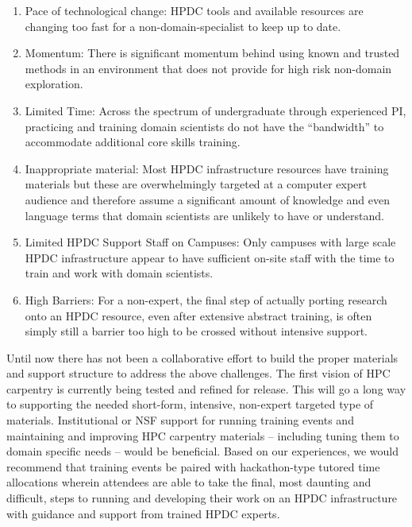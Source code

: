 \documentclass[10pt,letterpaper,draft]{article}
\begin{document}
\begin{enumerate}
    \item Pace of technological change: HPDC tools and available resources are changing too fast for a non-domain-specialist to keep up to date.
    \item Momentum:  There is significant momentum behind using known and trusted methods in an environment that does not provide for high risk non-domain exploration.
    \item Limited Time:  Across the spectrum of undergraduate through experienced PI, practicing and training domain scientists do not have the ``bandwidth'' to accommodate additional core skills training.
    \item Inappropriate material: Most HPDC infrastructure resources have training materials but these are overwhelmingly targeted at a computer expert audience and therefore assume a significant amount of knowledge and even language terms that domain scientists are unlikely to have or understand.
    \item Limited HPDC Support Staff on Campuses: Only campuses with large scale HPDC infrastructure appear to have sufficient on-site staff with the time to train and work with domain scientists. 
    \item High Barriers: For a non-expert, the final step of actually porting research onto an HPDC resource, even after extensive abstract training, is often simply still a barrier too high to be crossed without intensive support.

\end{enumerate}
Until now there has not been a collaborative effort to build the proper materials and support structure to address the above challenges. The first vision of HPC carpentry is currently being tested and refined for release. This will go a long way to supporting the needed short-form, intensive, non-expert targeted type of materials. Institutional or NSF support for running training events and maintaining and improving HPC carpentry materials -- including tuning them to domain specific needs -- would be beneficial. Based on our experiences, we would recommend that training events be paired with hackathon-type tutored time allocations wherein attendees are able to take the final, most daunting and difficult, steps to running and developing their work on an HPDC infrastructure with guidance and support from trained HPDC experts.
\end{document}
